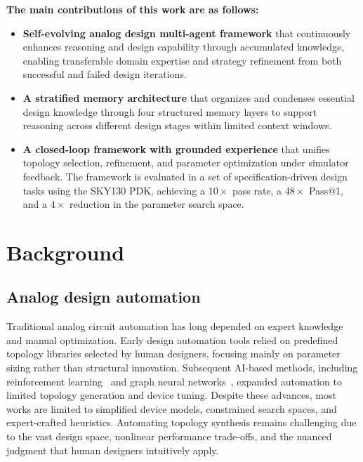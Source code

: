 \documentclass[sigconf,nonacm]{acmart}
\begin{document}
\textbf{The main contributions of this work are as follows:}
\begin{itemize}
	\item \textbf{Self-evolving analog design multi-agent framework} that continuously enhances reasoning and design capability through accumulated knowledge, enabling transferable domain expertise and strategy refinement from both successful and failed design iterations.
	\item \textbf{A stratified memory architecture} that organizes and condenses essential design knowledge through four structured memory layers to support reasoning across different design stages within limited context windows.
	\item \textbf{A closed-loop framework with grounded experience} that unifies topology selection, refinement, and parameter optimization under simulator feedback. The framework is evaluated in a set of specification-driven design tasks using the SKY130 PDK, achieving a $10\times$ pass rate, a $48\times$ Pass@1, and a $4\times$ reduction in the parameter search space.
\end{itemize}





\section{Background}

\subsection{Analog design automation}

Traditional analog circuit automation has long depended on expert knowledge and manual optimization. Early design automation tools relied on predefined topology libraries selected by human designers, focusing mainly on parameter sizing rather than structural innovation. Subsequent AI-based methods, including reinforcement learning~\cite{zhao2020deep,9576505} and graph neural networks~\cite{liu2021parasitic,dong2023cktgnn}, expanded automation to limited topology generation and device tuning. Despite these advances, most works are limited to simplified device models, constrained search spaces, and expert-crafted heuristics. Automating topology synthesis remains challenging \cite{10937153} due to the vast design space, nonlinear performance trade-offs, and the nuanced judgment that human designers intuitively apply.
\end{document}
